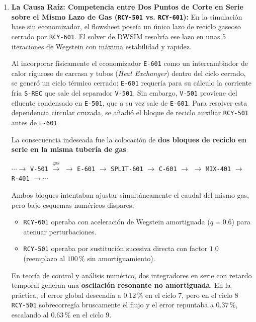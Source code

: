 \documentclass[11pt,a4paper]{article}
\begin{document}
\begin{enumerate}
    \item \textbf{La Causa Raíz: Competencia entre Dos Puntos de Corte en Serie sobre el Mismo Lazo de Gas (\texttt{RCY-501} vs. \texttt{RCY-601}):}  
    En la simulación base sin economizador, el flowsheet poseía un único lazo de reciclo gaseoso cerrado por \texttt{RCY-601}. El solver de DWSIM resolvía ese lazo en unas 5 iteraciones de Wegstein con máxima estabilidad y rapidez.
    
    Al incorporar físicamente el economizador \texttt{E-601} como un intercambiador de calor riguroso de carcasa y tubos (\textit{Heat Exchanger}) dentro del ciclo cerrado, se generó un ciclo térmico cerrado: \texttt{E-601} requería para su cálculo la corriente fría \texttt{S-REC} que sale del separador \texttt{V-501}. Sin embargo, \texttt{V-501} proviene del efluente condensado en \texttt{E-501}, que a su vez sale de \texttt{E-601}. Para resolver esta dependencia circular cruzada, se añadió el bloque de reciclo auxiliar \texttt{RCY-501} antes de \texttt{E-601}.
    
    La consecuencia indeseada fue la colocación de \textbf{dos bloques de reciclo en serie en la misma tubería de gas}:
    \begin{center}
        $\cdots \to$ \texttt{V-501} $\xrightarrow{\text{gas}}$  $\to$ \texttt{E-601} $\to$ \texttt{SPLIT-601} $\to$ \texttt{C-601} $\to$  $\to$ \texttt{MIX-401} $\to$ \texttt{R-401} $\to \cdots$
    \end{center}
    
    Ambos bloques intentaban ajustar simultáneamente el caudal del mismo gas, pero bajo esquemas numéricos dispares:
    \begin{itemize}
        \item \texttt{RCY-601} operaba con aceleración de Wegstein amortiguada ($q = 0.6$) para atenuar perturbaciones.
        \item \texttt{RCY-501} operaba por sustitución sucesiva directa con factor $1.0$ (reemplazo al $100\,\%$ sin amortiguamiento).
    \end{itemize}
    En teoría de control y análisis numérico, dos integradores en serie con retardo temporal generan una \textbf{oscilación resonante no amortiguada}. En la práctica, el error global descendía a $0.12\,\%$ en el ciclo 7, pero en el ciclo 8 \texttt{RCY-501} sobrecorregía bruscamente el flujo y el error repuntaba a $0.37\,\%$, escalando al $0.63\,\%$ en el ciclo 9.


\end{enumerate}
\end{document}
